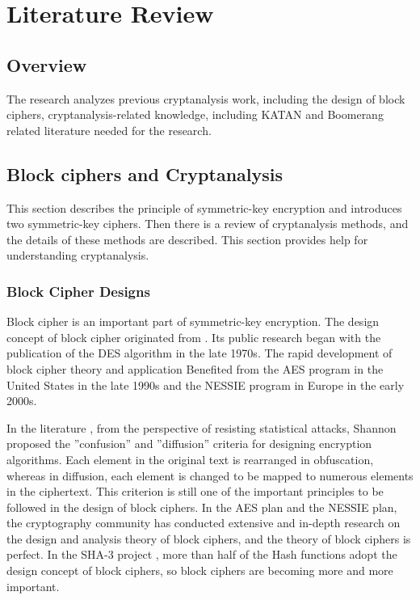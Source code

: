 \chapter{Literature Review}\label{chap:review}
\section{Overview}
The research analyzes previous cryptanalysis work, including the design of block ciphers, cryptanalysis-related knowledge, including KATAN and Boomerang related literature needed for the research.


\section{Block ciphers and Cryptanalysis}\label{sec:symmetric_review}
This section describes the principle of symmetric-key encryption and introduces two symmetric-key ciphers. Then there is a review of cryptanalysis methods, and the details of these methods are described. This section provides help for understanding cryptanalysis.

\subsection{Block Cipher Designs}

Block cipher is an important part of symmetric-key encryption. The design concept of block cipher originated from \cite{6769090}. Its public research began with the publication of the DES algorithm \cite{pub1999data} in the late 1970s. The rapid development of block cipher theory and application Benefited from the AES \cite{dworkin2001advanced} program in the United States in the late 1990s  and the NESSIE program in Europe in the early 2000s. 

In the literature \cite{6769090}, from the perspective of resisting statistical attacks, Shannon proposed the ”confusion” and ”diffusion” criteria for designing encryption algorithms. Each element in the original text is rearranged in obfuscation, whereas in diffusion, each element is changed to be mapped to numerous elements in the ciphertext. This criterion is still one of the important principles to be followed in the design of block ciphers. In the AES plan and the NESSIE plan, the cryptography community has conducted extensive and in-depth research on the design and analysis theory of block ciphers, and the theory of block ciphers is perfect. In the SHA-3 project \cite{dworkin2015sha}, more than half of the Hash functions adopt the design concept of block ciphers, so block ciphers are becoming more and more important. 

